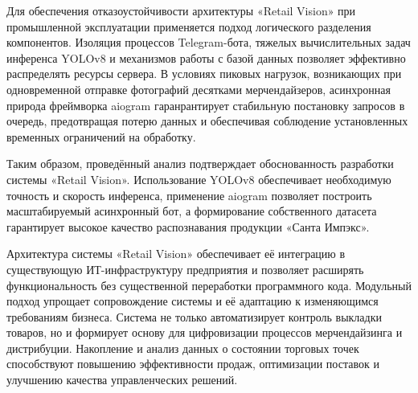 {  \par \redline Для обеспечения отказоустойчивости архитектуры «Retail Vision» при промышленной 
  эксплуатации применяется подход логического разделения компонентов. Изоляция процессов Telegram-бота, 
  тяжелых вычислительных задач инференса YOLOv8 и механизмов работы с базой данных позволяет 
  эффективно распределять ресурсы сервера. В условиях пиковых нагрузок, возникающих при 
  одновременной отправке фотографий десятками мерчендайзеров, асинхронная природа фреймворка aiogram 
  гаранрантирует стабильную постановку запросов в очередь, предотвращая потерю данных и обеспечивая 
  соблюдение установленных временных ограничений на обработку.
  
  \par \redline Таким образом, проведённый анализ подтверждает обоснованность
  разработки системы «Retail Vision».
  Использование YOLOv8 обеспечивает необходимую точность и скорость инференса,
  применение aiogram позволяет построить масштабируемый асинхронный бот,
  а формирование собственного датасета гарантирует высокое качество распознавания
  продукции «Санта Импэкс».

  \par \redline Архитектура системы «Retail Vision» обеспечивает её интеграцию в существующую ИТ-инфраструктуру предприятия и позволяет расширять функциональность без существенной переработки программного кода. Модульный подход упрощает сопровождение системы и её адаптацию к изменяющимся требованиям бизнеса. Система не только автоматизирует контроль выкладки товаров, но и формирует основу для цифровизации процессов мерчендайзинга и дистрибуции. Накопление и анализ данных о состоянии торговых точек способствуют повышению эффективности продаж, оптимизации поставок и улучшению качества управленческих решений.
  \par
}

\setcounter{subchaptercntr}{1}
\setcounter{formulacntr}{1}
\setcounter{imagecntr}{1}
\setcounter{tablecntr}{1}
